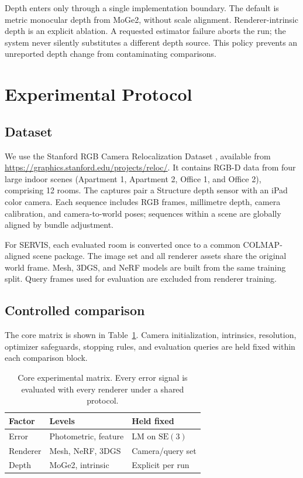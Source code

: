 \documentclass[10pt,twocolumn]{article}
\newcommand{\method}{\textsc{SERVIS}}
\newcommand{\SEthree}{\mathrm{SE}(3)}
\begin{document}
Depth enters only through a single implementation boundary. The default is
metric monocular depth from MoGe2, without scale alignment. Renderer-intrinsic
depth is an explicit ablation. A requested estimator failure aborts the run;
the system never silently substitutes a different depth source. This policy
prevents an unreported depth change from contaminating comparisons.

\section{Experimental Protocol}

\subsection{Dataset}

We use the Stanford RGB Camera Relocalization Dataset
\cite{valentin2016learning}, available from
\url{https://graphics.stanford.edu/projects/reloc/}. It contains RGB-D data
from four large indoor scenes (Apartment 1, Apartment 2, Office 1, and Office
2), comprising 12 rooms. The captures pair a Structure depth sensor with an
iPad color camera. Each sequence includes RGB frames, millimetre depth, camera
calibration, and camera-to-world poses; sequences within a scene are globally
aligned by bundle adjustment.

For \method, each evaluated room is converted once to a common COLMAP-aligned
scene package. The image set and all renderer assets share the original world
frame. Mesh, 3DGS, and NeRF models are built from the same training split. Query
frames used for evaluation are excluded from renderer training.

\subsection{Controlled comparison}

The core matrix is shown in Table~\ref{tab:matrix}. Camera initialization,
intrinsics, resolution, optimizer safeguards, stopping rules, and evaluation
queries are held fixed within each comparison block.

\begin{table}[t]
  \centering
  \caption{Core experimental matrix. Every error signal is evaluated with
  every renderer under a shared protocol.}
  \label{tab:matrix}
  \small
  \begin{tabular}{@{}lll@{}}
    \toprule
    Factor & Levels & Held fixed \\
    \midrule
    Error & Photometric, feature & LM on $\SEthree$ \\
    Renderer & Mesh, NeRF, 3DGS & Camera/query set \\
    Depth & MoGe2, intrinsic & Explicit per run \\
    \bottomrule
  \end{tabular}
\end{table}
\end{document}
